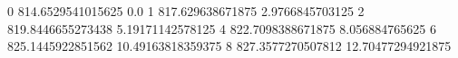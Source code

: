 0 814.6529541015625 0.0
1 817.629638671875 2.9766845703125
2 819.8446655273438 5.19171142578125
4 822.7098388671875 8.056884765625
6 825.1445922851562 10.49163818359375
8 827.3577270507812 12.70477294921875
